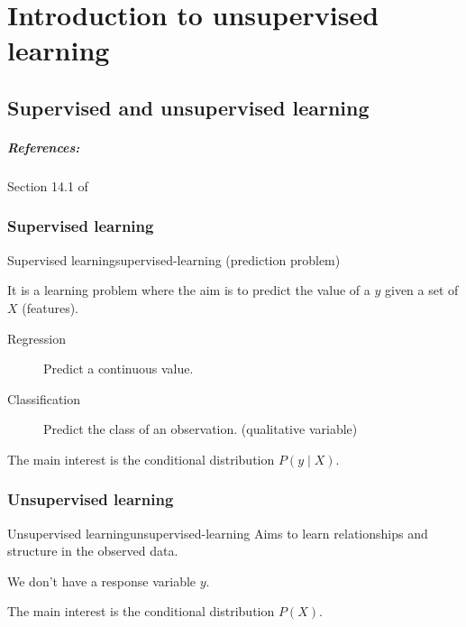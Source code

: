 \chapter[Introduction]{Introduction to unsupervised learning}

\section{Supervised and unsupervised learning}

\paragraph{References:} Section 14.1 of \cite{hastie_elements_2009}

\subsection{Supervised learning}

\begin{definition}{Supervised learning}{supervised-learning}
	(prediction problem)

	It is a learning problem where the aim is to predict the value of a
	 $y$ given a set of  $X$
	(features).

	\begin{description}
		\item[Regression] Predict a continuous value.
		\item[Classification] Predict the class of an observation. (qualitative variable)
	\end{description}

	\tcblower

	The main interest is the conditional distribution $P(y \mid X)$.

\end{definition}

\subsection{Unsupervised learning}

\begin{definition}{Unsupervised learning}{unsupervised-learning}
	Aims to learn relationships and structure in the observed data.

	We don't have a response variable $y$.

	\tcblower

	The main interest is the conditional distribution $P(X)$.

\end{definition}

